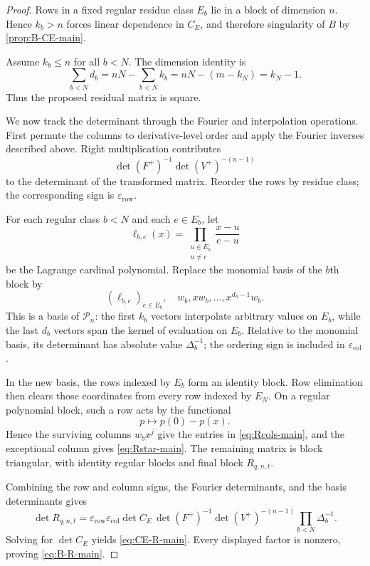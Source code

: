\documentclass[11pt]{amsart}
\newcommand{\PP}{\mathcal P}
\newcommand{\1}{\mathbf 1}
\theoremstyle{remark}
\begin{document}
\begin{proof}
Rows in a fixed regular residue class $E_b$ lie in a block of dimension $n$. Hence $k_b>n$ forces linear dependence in $C_E$, and therefore singularity of $B$ by \cref{prop:B-CE-main}.

Assume $k_b\le n$ for all $b<N$. The dimension identity is
\[
 \sum_{b<N}d_b=nN-\sum_{b<N}k_b=nN-(m-k_N)=k_N-1.
\]
Thus the proposed residual matrix is square.

We now track the determinant through the Fourier and interpolation operations. First permute the columns to derivative-level order and apply the Fourier inverses described above. Right multiplication contributes
\[
 \det(F^+)^{-1}\det(V^+)^{-(n-1)}
\]
to the determinant of the transformed matrix. Reorder the rows by residue class; the corresponding sign is $\varepsilon_{\mathrm{row}}$.

For each regular class $b<N$ and each $e\in E_b$, let
\[
 \ell_{b,e}(x)=\prod_{\substack{u\in E_b\\u\ne e}}\frac{x-u}{e-u}
\]
be the Lagrange cardinal polynomial. Replace the monomial basis of the $b$th block by
\begin{equation}\label{eq:lagrange-null-basis-main}
 (\ell_{b,e})_{e\in E_b},\quad
 w_b,xw_b,\ldots,x^{d_b-1}w_b.
\end{equation}
This is a basis of $\PP_n$: the first $k_b$ vectors interpolate arbitrary values on $E_b$, while the last $d_b$ vectors span the kernel of evaluation on $E_b$. Relative to the monomial basis, its determinant has absolute value $\Delta_b^{-1}$; the ordering sign is included in $\varepsilon_{\mathrm{col}}$.

In the new basis, the rows indexed by $E_b$ form an identity block. Row elimination then clears those coordinates from every row indexed by $E_N$. On a regular polynomial block, such a row acts by the functional
\[
 p\longmapsto p(0)-p(x).
\]
Hence the surviving columns $w_bx^j$ give the entries in \eqref{eq:Rcols-main}, and the exceptional column gives \eqref{eq:Rstar-main}. The remaining matrix is block triangular, with identity regular blocks and final block $R_{q,n,t}$.

Combining the row and column signs, the Fourier determinants, and the basis determinants gives
\[
 \det R_{q,n,t}
 =\varepsilon_{\mathrm{row}}\varepsilon_{\mathrm{col}}
 \det C_E\,\det(F^+)^{-1}\det(V^+)^{-(n-1)}
 \prod_{b<N}\Delta_b^{-1}.
\]
Solving for $\det C_E$ yields \eqref{eq:CE-R-main}. Every displayed factor is nonzero, proving \eqref{eq:B-R-main}.
\end{proof}
\end{document}
